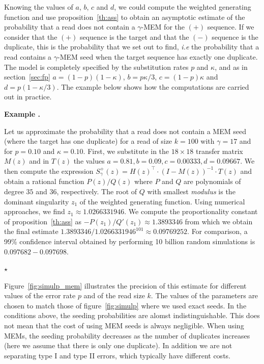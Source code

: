 \documentclass{article}
\newcounter{examplecounter}
\newenvironment{example}
{\small\vspace{0.5\baselineskip}
  \refstepcounter{examplecounter}%
  \noindent\textbf{Example \arabic{examplecounter}.}%
}{\vspace{-0.2\baselineskip}\begin{center}%
  $\star$\end{center}\vspace{0.5\baselineskip}}
\begin{document}
Knowing the values of $a$, $b$, $c$ and $d$, we could compute the weighted
generating function and use proposition~\ref{th:ass} to obtain an
asymptotic estimate of the probability that a read does not contain a
$\gamma$-MEM for the $(+)$ sequence. If we consider that the $(+)$
sequence is the target and that the $(-)$ sequence is the duplicate, this
is the probability that we set out to find, \textit{i.e} the probability
that a read contains a $\gamma$-MEM seed when the target sequence has
exactly one duplicate. The model is completely specified by the
substitution rates $p$ and $\kappa$, and as in section~\ref{sec:fp} $a =
(1-p)(1-\kappa)$, $b = p\kappa/3$, $c = (1-p)\kappa$ and $d =
p(1-\kappa/3)$. The example below shows how the computations are carried
out in practice.



\begin{example}
\label{ex:num6}
Let us approximate the probability that a read does not contain a MEM seed
(where the target has one duplicate) for a read of size $k=100$ with
$\gamma=17$ and for $p=0.10$ and $\kappa=0.10$. First, we substitute in
the $18 \times 18$ transfer matrix $M(z)$ and in $T(z)$ the values
$a=0.81, b=0.09, c=0.00333, d=0.09667$. We then compute the expression
$S^+_\gamma(z) = H(z)^\top \cdot (I-M(z))^{-1} \cdot T(z)$ and obtain a
rational function $P(z)/Q(z)$ where $P$ and $Q$ are polynomials of degree
$35$ and $36$, respectively. The root of $Q$ with smallest
\textit{modulus} is the dominant singularity $z_1$ of the weighted
generating function. Using numerical approaches, we find $z_1 \approx
1.0266331946$. We compute the proportionality constant of
proposition~\ref{th:ass} as $-P(z_1)/Q'(z_1) \approx 1.3893346$ from which
we obtain the final estimate $1.3893346/1.0266331946^{101} \approx
0.09769252$. For comparison, a 99\% confidence interval obtained by
performing 10 billion random simulations is $0.097682-0.097698$.
\end{example}

Figure~\ref{fig:simulp_mem} illustrates the precision of this estimate for
different values of the error rate $p$ and of the read size $k$. The
values of the parameters are chosen to match those of
figure~\ref{fig:simulp} where we used exact seeds. In the conditions
above, the seeding probabilities are alomst indistinguishable. This does
not mean that the cost of using MEM seeds is always negligible. When using
MEMs, the seeding probability decreases as the number of duplicates
increases (here we assume that there is only one duplicate). In addition
we are not separating type I and type II errors, which typically have
different costs.
\end{document}
